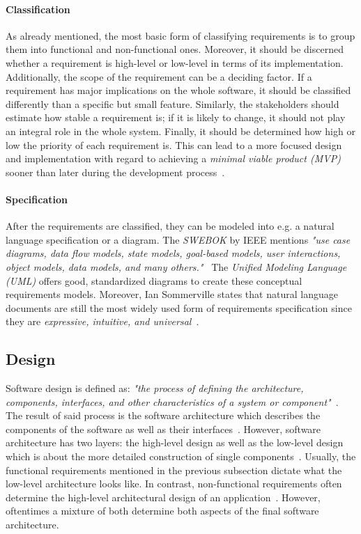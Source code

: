 \documentclass[12pt,a4paper,twoside]{report}
\begin{document}
\paragraph{Classification}
As already mentioned, the most basic form of classifying requirements is to group
them into functional and non-functional ones. Moreover, it should be discerned
whether a requirement is high-level or low-level in terms of its implementation.
Additionally, the scope of the requirement can be a deciding factor.
If a requirement has major implications on the whole software, it should be classified
differently than a specific but small feature. Similarly, the stakeholders should
estimate how stable a requirement is; if it is likely to change, it should not
play an integral role in the whole system.
Finally, it should be determined how high or low the priority of each requirement is.
This can lead to a more focused design and implementation with regard to achieving
a \textit{minimal viable product (MVP)} sooner than later during
the development process~\cite{swebok, sommerville-se}.

\paragraph{Specification}
After the requirements are classified, they can be modeled into e.g.
a natural language specification or a diagram.
The \textit{SWEBOK} by IEEE mentions \textit{"use case diagrams, data flow models,
state models, goal-based models, user interactions,
object models, data models, and many others."}~\cite{swebok}
The \textit{Unified Modeling Language (UML)} offers good, standardized diagrams
to create these conceptual requirements models.
Moreover, Ian Sommerville states that natural language documents
are still the most widely used form of requirements specification since they are
\textit{expressive, intuitive, and universal}~\cite{sommerville-se}.


\subsection{Design} \label{subsect:design}

Software design is defined as: \textit{"the process of defining
the architecture, components, interfaces, and other characteristics
of a system or component"}~\cite{iso-se}.
The result of said process is the software architecture which describes the
components of the software as well as their interfaces~\cite{swebok}.
However, software architecture has two layers: the high-level design as well as
the low-level design which is about the more detailed
construction of single components~\cite{iso-sdlc}.
Usually, the functional requirements mentioned in the previous subsection dictate
what the low-level architecture looks like. In contrast, non-functional
requirements often determine the high-level architectural design of an application~\cite{bosch-sa}.
However, oftentimes a mixture of both determine both aspects of the final software architecture.
\end{document}
